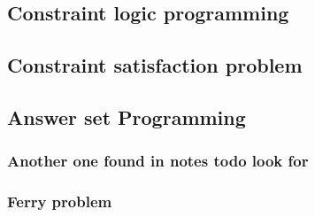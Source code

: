 \documentclass[11pt]{article}
\begin{document}
\subsection{Constraint logic programming}
\label{sec:orgb6ff779}
\subsection{Constraint satisfaction problem}
\label{sec:orge6f54ab}
\subsection{Answer set Programming}
\label{sec:org0f06330}
\subsubsection{Another one found in notes todo look for}
\label{sec:org1bdcefa}
\subsubsection{Ferry problem}
\label{sec:orga06bbcc}
\end{document}

